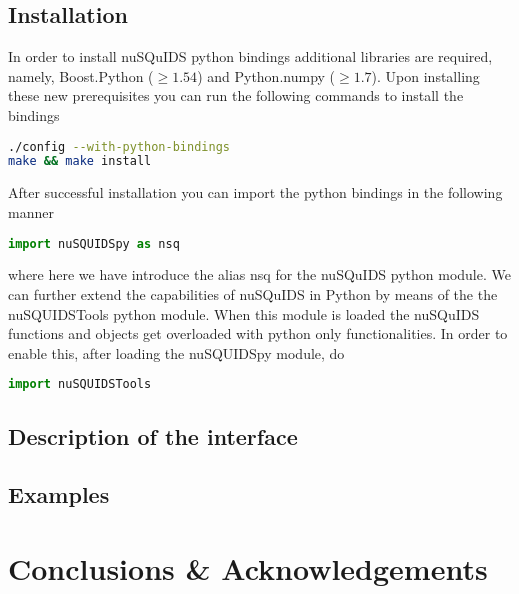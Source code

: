 \documentclass[3p,12pt]{elsarticle}
\begin{document}
\subsection{Installation}

In order to install nuSQuIDS python bindings additional libraries are required, namely, {\ttfamily Boost.Python} ($\ge1.54$) and {\ttfamily Python.numpy} ($\ge1.7$). Upon installing these new prerequisites you can run the following commands to install the bindings


\begin{lstlisting}[language=Bash]
./config --with-python-bindings
make && make install
\end{lstlisting}

After successful installation you can import the python bindings in the following manner

\begin{lstlisting}[language=Python]
import nuSQUIDSpy as nsq
\end{lstlisting}
where here we have introduce the alias {\ttfamily nsq} for the nuSQuIDS python module. We can further extend the
capabilities of nuSQuIDS in {\ttfamily Python} by means of the the {\ttfamily nuSQUIDSTools} python module. When 
this module is loaded the nuSQuIDS functions and objects get overloaded with python only functionalities. In order to enable this, after loading the {\ttfamily nuSQUIDSpy} module, do

\begin{lstlisting}[language=Python]
import nuSQUIDSTools
\end{lstlisting}


\subsection{Description of the interface}



\subsection{Examples}

\section{Conclusions \& Acknowledgements} 
\label{sec:conclu} 


%
%


\end{document}
